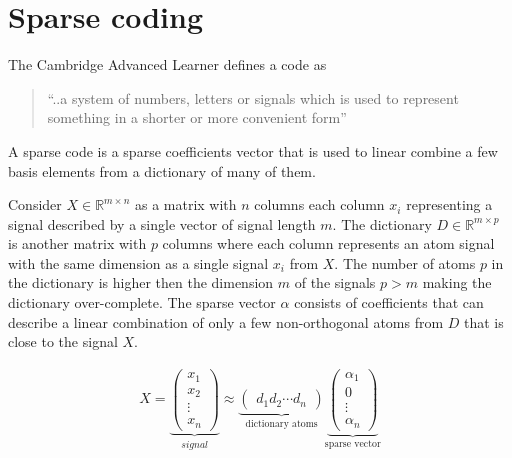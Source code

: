 \chapter{Sparse coding}
\label{chap:sparse_coding}

The Cambridge Advanced Learner defines a code as
\begin{quotation}
 ``..a system of numbers, letters or signals which is used to represent
something in a shorter or more convenient form''
\end{quotation}
A sparse code is a sparse coefficients vector that is used to linear combine a
few basis elements from a dictionary of many of them.

Consider $X \in \mathbb{R}^{m\times n}$  as a matrix with $n$ columns each
column $x_{i}$ representing a signal described by a single vector of
signal length $m$. The dictionary $D\in\mathbb{R}^{m \times p}$ is another
matrix with $p$ columns where each column represents an atom signal with the
same dimension as a single signal $x_{i}$ from $X$. The number of 
atoms $p$ in the dictionary is higher then the dimension $m$ of the signals
$p > m$ making the dictionary over-complete. The sparse vector $\alpha$ consists
of coefficients that can describe a linear combination of only a few
non-orthogonal atoms from $D$ that is close to the signal $X$. 

\begin{align}
X = \underbrace{\begin{pmatrix} x_1 \\ x_2 \\ \vdots \\ x_n
\end{pmatrix}}_{signal}
\approx \underbrace{\begin{pmatrix} d_1  d_2 \cdots d_n
\end{pmatrix}}_{\textrm{dictionary atoms}}
\underbrace{\begin{pmatrix} \alpha_1 \\ 0 \\ \vdots \\ \alpha_n
\end{pmatrix}}_{\textrm{sparse vector}}
\end{align}


